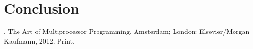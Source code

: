 \documentclass[12pt]{article} %
\begin{document}







\section{Conclusion} %

\lipsum[12-13]


\begin{thebibliography}{99} %

. The Art of Multiprocessor Programming. Amsterdam; London: Elsevier/Morgan Kaufmann, 2012. Print.
\end{thebibliography}

\end{document}
